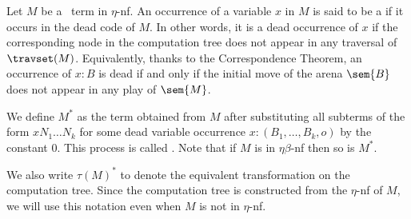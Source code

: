 Let $M$  be a \pcf\ term in $\eta$-nf.
An occurrence of a variable $x$ in $M$ is said to be a 
if it occurs in the dead code of $M$. In other words, it is a
dead occurrence of $x$ if the corresponding node in the computation tree does not appear in any traversal of $\travset(M)$. Equivalently, thanks to the Correspondence Theorem, an occurrence of $x:B$ is dead if and only if the initial move
of the arena $\sem{B}$ does not appear in any play of $\sem{M}$.


We define $M^*$ as the term obtained from $M$ after substituting all subterms of the form  $x N_1 \dots N_k$ for some dead variable occurrence $x:(B_1,\ldots, B_k, o)$ by the constant $0$. This process is called .
Note that if $M$ is in $\eta\beta$-nf then so is $M^*$.

We also write $\tau(M)^*$ to denote the equivalent transformation on the computation tree. Since the computation tree is constructed from the $\eta$-nf of $M$, we will use this notation even when $M$ is not in $\eta$-nf.



